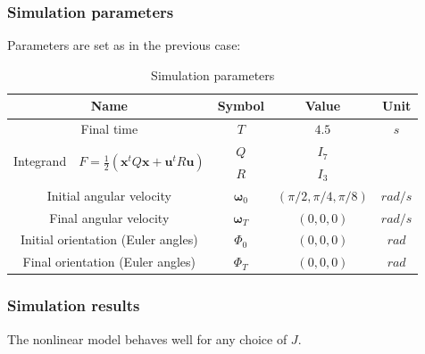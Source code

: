 \documentclass{beamer}
\begin{document}
\begin{frame} \frametitle{Simulation parameters}
	\pause
	Parameters are set as in the previous case:
	\pause
	{\tiny
		\begin{table}
			\centering
			\begin{tabular}{cccc}
				\toprule
				\textbf{Name} & \textbf{Symbol} & \textbf{Value} & \textbf{Unit} \\
				\midrule
				Final time & $T$ & $4.5$ & $s$ \\
				\multirow{2}{*}{ Integrand\ \
					$F = \frac{1}{2}( \bm{x}^tQ\bm{x} + \bm{u}^tR\bm{u})$ } & $Q$ & $I_7$ & \\
				& $R$ & $I_3$ & \\
				Initial angular velocity & $\bm{\omega}_0$ & $(\pi/2,\pi/4,\pi/8)$ & $rad/s$ \\
				Final angular velocity & $\bm{\omega}_T$ & $(0,0,0)$ & $rad/s$ \\
				Initial orientation (Euler angles) & $\Phi_0$ & $(0,0,0)$ & $rad$ \\
				Final orientation (Euler angles) & $\Phi_T$ & $(0,0,0)$ & $rad$ \\
				\bottomrule
			\end{tabular}
			\caption{Simulation parameters}
		\end{table}
	}
\end{frame}

\begin{frame} \frametitle{Simulation results}
	 {The nonlinear model behaves well for any choice of $J$.}
\end{frame}
\end{document}
